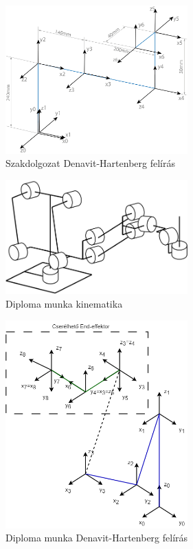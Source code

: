 \begin{figure}[!ht]
\centering
\includegraphics[width=70mm, keepaspectratio]{figures/Szakdoga/v_2_dh}
\caption{Szakdolgozat Denavit-Hartenberg felírás}
\label{fig:Csuklo}
\end{figure}

\begin{figure}[!ht]
\centering
\includegraphics[width=70mm, keepaspectratio]{figures/Diagrammok/Diploma_kinematika}
\caption{Diploma munka kinematika}
\label{fig:Csuklo}
\end{figure}


\begin{figure}[!ht]
\centering
\includegraphics[width=70mm, keepaspectratio]{figures/Diagrammok/DH_feliras}
\caption{Diploma munka Denavit-Hartenberg felírás}
\label{fig:Csuklo}
\end{figure}



